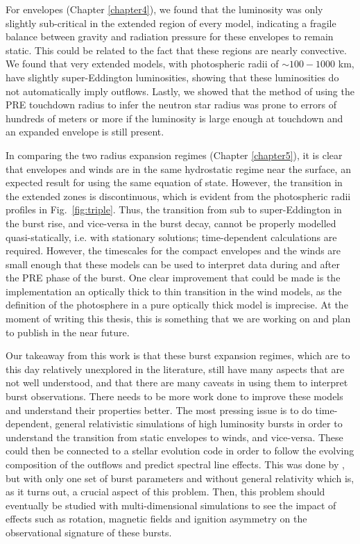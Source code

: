 \documentclass[../main.tex]{subfiles}
\begin{document}
For envelopes (Chapter \ref{chapter4}), we found that the luminosity was only slightly sub-critical in the extended region of every model, indicating a fragile balance between gravity and radiation pressure for these envelopes to remain static. This could be related to the fact that these regions are nearly convective. We found that very extended models, with photospheric radii of ${\sim}100-1000$ km, have slightly super-Eddington luminosities, showing that these luminosities do not automatically imply outflows. Lastly, we showed that the method of using the PRE touchdown radius to infer the neutron star radius was prone to errors of hundreds of meters or more if the luminosity is large enough at touchdown and an expanded envelope is still present. 

In comparing the two radius expansion regimes (Chapter \ref{chapter5}), it is clear that envelopes and winds are in the same hydrostatic regime near the surface, an expected result for using the same equation of state. However, the transition in the extended zones is discontinuous, which is evident from the photospheric radii profiles in Fig.~\ref{fig:triple}. Thus, the transition from sub to super-Eddington in the burst rise, and vice-versa in the burst decay, cannot be properly modelled quasi-statically, i.e. with stationary solutions; time-dependent calculations are required. However, the timescales for the compact envelopes and the winds are small enough that these models can be used to interpret data during and after the PRE phase of the burst. One clear improvement that could be made is the implementation an optically thick to thin transition in the wind models, as the definition of the photosphere in a pure optically thick model is imprecise. At the moment of writing this thesis, this is something that we are working on and plan to publish in the near future. 

Our takeaway from this work is that these burst expansion regimes, which are to this day relatively unexplored in the literature, still have many aspects that are not well understood, and that there are many caveats in using them to interpret burst observations. There needs to be more work done to improve these models and understand their properties better. The most pressing issue is to do time-dependent, general relativistic simulations of high luminosity bursts in order to understand the transition from static envelopes to winds, and vice-versa. These could then be connected to a stellar evolution code in order to follow the evolving composition of the outflows and predict spectral line effects. This was done by \citet{YuHangWeinberg2018}, but with only one set of burst parameters and without general relativity which is, as it turns out, a crucial aspect of this problem. Then, this problem should eventually be studied with multi-dimensional simulations to see the impact of effects such as rotation, magnetic fields and ignition asymmetry on the observational signature of these bursts.
\end{document}
